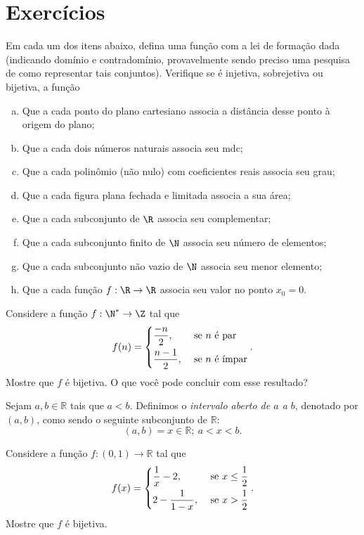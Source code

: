 \section{Exercícios}

\begin{exercise}
Em cada um dos itens abaixo, defina uma função com a lei de
formação dada (indicando domínio e contradomínio, provavelmente sendo preciso uma pesquisa de como representar tais conjuntos). Verifique se é injetiva, sobrejetiva ou bijetiva, a função
\begin{enumerate}[(a)]
  \item Que a cada ponto do plano cartesiano associa a distância desse ponto à origem do plano;
  \item Que a cada dois números naturais associa seu mdc;
  \item Que a cada polinômio (não nulo) com coeficientes reais
  associa seu grau;
  \item Que a cada figura plana fechada e limitada associa a sua
  área;
  \item Que a cada subconjunto de $\R$ associa seu complementar;
  \item Que a cada subconjunto finito de $\N$ associa seu número de
  elementos;
  \item Que a cada subconjunto não vazio de $\N$ associa seu menor
  elemento;
  \item Que a cada função $f: \R \to \R$ associa seu valor no ponto
  $x_0 = 0$.
\end{enumerate}
\end{exercise}

\begin{exercise}
Considere a  função $f:  \N^*  \to      \Z $ tal que $$f(n) =
\begin{dcases} 
  \dfrac {-n} 2, & \text{ se $n$ é par} \\ 
  \dfrac {n-1} 2, & \text{ se $n$ é ímpar} 
\end{dcases}.$$ 
Mostre que $f$ é bijetiva. O que você pode
concluir com esse resultado?
\end{exercise}

\begin{exercise}
  Sejam $a, b \in \mathbb R$ tais que $a < b$. Definimos o \emph{intervalo aberto de $a$ a $b$}, denotado por $(a, b)$, como sendo o seguinte subconjunto de $\mathbb R$:
$$ (a,b) = { x \in \mathbb R ; \ a < x < b }.$$

Considere a função $f : (0,1) \to \mathbb R$ tal que
$$f(x) =
\begin{dcases} 
  \dfrac 1 x - 2, & \text{ se $x \leq \dfrac 1 2$} \\
  2 - \dfrac 1 {1 - x} , & \text{ se $x > \dfrac 1 2$}
\end{dcases}.$$
Mostre que $f$ é bijetiva.
\end{exercise}

